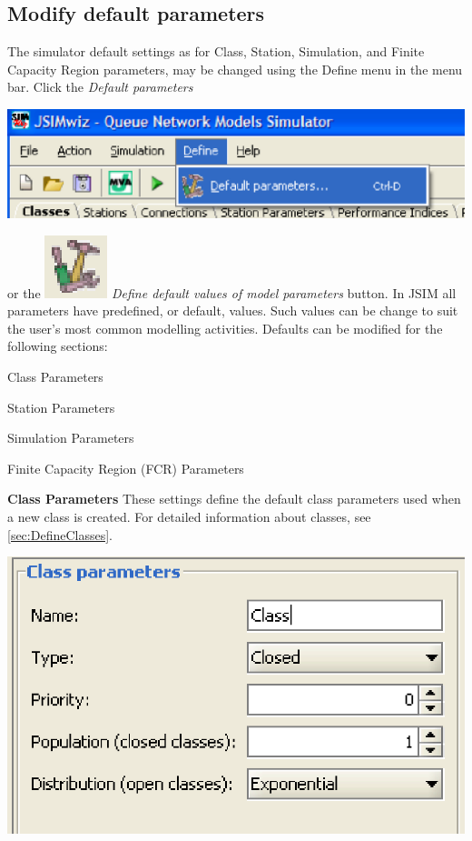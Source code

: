 \begin{description*}
\section{Modify default parameters}
\label{sec:ModifyDefaultParameters} The simulator default settings
as for Class, Station, Simulation, and Finite Capacity Region
parameters, may be changed using the Define menu in the menu bar.
Click the \emph{Default parameters}
\begin{center}
\includegraphics[scale=.5]{img/jsim/define1.eps}
\end{center}
or the \includegraphics[scale=.5]{img/jsim/define2.eps}
\emph{Define default values of model parameters} button. In JSIM
all parameters have predefined, or default, values. Such values
can be change to suit the user's most common modelling activities.
Defaults can be modified for the following sections:
\begin{itemize*}
\item Class Parameters
\item Station Parameters
\item Simulation Parameters
\item Finite Capacity Region (FCR) Parameters
\end{itemize*}
\textbf{Class Parameters}
These settings define the default class parameters used when a new class is created. For detailed information about classes, see \autoref{sec:DefineClasses}.
\begin{center}
\includegraphics[scale=.5]{img/jsim/Class_Parameters.eps}

\end{center}
\end{description*}
